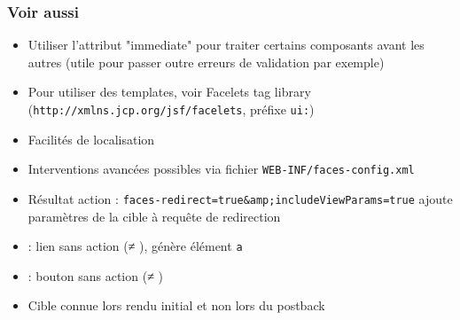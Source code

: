 \documentclass[english, french]{beamer}
\begin{document}
\begin{frame}
	\frametitle{Voir aussi}
	\begin{itemize}
		\item Utiliser l’attribut "immediate" pour traiter certains composants avant les autres (utile pour passer outre erreurs de validation par exemple)
		\item Pour utiliser des templates, voir Facelets tag library (\texttt{http://xmlns.jcp.org/jsf/facelets}, préfixe \texttt{ui:}) %
		\item Facilités de localisation
		\item Interventions avancées possibles via fichier \texttt{WEB-INF/faces-config.xml}
		\item Résultat action : {\texttt{faces-redirect=true\&amp;includeViewParams=true}} ajoute paramètres de la cible à requête de redirection
		\item {} : lien sans action ({≠} ), génère élément \texttt{a}
		\item {} : bouton sans action ({≠} )
		\item Cible connue lors rendu initial {\tiny et non lors du postback}
	\end{itemize}
\end{frame}
\end{document}
